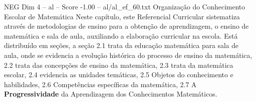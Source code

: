\begin{textsample}{NEG Dim 4 – al – Score -1.00 – al/al\_ef\_60.txt}
Organização do Conhecimento Escolar de Matemática Neste capítulo, este Referencial Curricular sistematiza através de metodologias de ensino para a obtenção de aprendizagem, o ensino de matemática e sala de aula, auxiliando a elaboração curricular na escola.
Está distribuído em seções, a seção 2.1 trata da educação matemática para sala de aula, onde se evidencia a evolução histórica do processo de ensino da matemática, 2.2 trata das concepções de ensino da matemática, 2.3 trata da matemática escolar, 2.4 evidencia as unidades temáticas, 2.5 Objetos do conhecimento e habilidades, 2.6 Competências específicas da matemática, 2.7 A \textbf{Progressividade} da Aprendizagem dos Conhecimentos Matemáticos.

\end{textsample}
